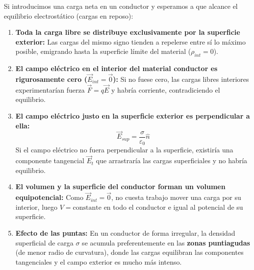 \begin{definicion}
Si introducimos una carga neta en un conductor y esperamos a que alcance el equilibrio electrostático (cargas en reposo):
\begin{enumerate}[leftmargin=*]
    \item \textbf{Toda la carga libre se distribuye exclusivamente por la superficie exterior:} Las cargas del mismo signo tienden a repelerse entre sí lo máximo posible, emigrando hasta la superficie límite del material ($\rho_{int} = 0$).
    \item \textbf{El campo eléctrico en el interior del material conductor es rigurosamente cero ($\vec{E}_{int} = \vec{0}$):} Si no fuese cero, las cargas libres interiores experimentarían fuerza $\vec{F}=q\vec{E}$ y habría corriente, contradiciendo el equilibrio.
    \item \textbf{El campo eléctrico justo en la superficie exterior es perpendicular a ella:}
    \begin{equation}
        \vec{E}_{sup} = \frac{\sigma}{\varepsilon_0} \hat{n}
    \end{equation}
    Si el campo eléctrico no fuera perpendicular a la superficie, existiría una componente tangencial $\vec{E}_t$ que arrastraría las cargas superficiales y no habría equilibrio.
    \item \textbf{El volumen y la superficie del conductor forman un volumen equipotencial:} Como $\vec{E}_{int} = \vec{0}$, no cuesta trabajo mover una carga por su interior, luego $V = \text{constante}$ en todo el conductor e igual al potencial de su superficie.
    \item \textbf{Efecto de las puntas:} En un conductor de forma irregular, la densidad superficial de carga $\sigma$ se acumula preferentemente en las \textbf{zonas puntiagudas} (de menor radio de curvatura), donde las cargas equilibran las componentes tangenciales y el campo exterior es mucho más intenso.
\end{enumerate}
\end{definicion}

